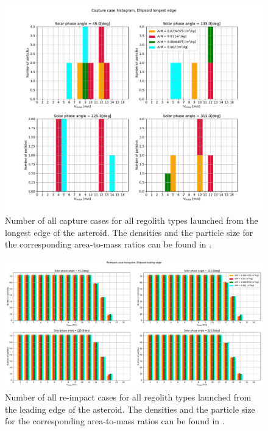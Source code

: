 \begin{figure}[htb]
\centering
\captionsetup{justification=centering}
\includegraphics[width=\textwidth, height=\textheight, keepaspectratio=true]{longest_edge_perturbations/multiple_regolith_types/allPhases_captureCases.pdf}
\caption{Number of all capture cases for all regolith types launched from the longest edge of the asteroid. The densities and the particle size for the corresponding area-to-mass ratios can be found in .}
\label{fig:longestEdge_allParticles_capture_hist}
\end{figure}
\FloatBarrier
\begin{figure}[htb]
\centering
\captionsetup{justification=centering}
\includegraphics[angle=90, width=\textwidth, height=\textheight, keepaspectratio=true]{leading_edge_perturbations/allReimpactCases.pdf}
\caption{Number of all re-impact cases for all regolith types launched from the leading edge of the asteroid. The densities and the particle size for the corresponding area-to-mass ratios can be found in .}
\label{fig:leadingEdge_allParticles_reimpact_hist}
\end{figure}
\FloatBarrier

